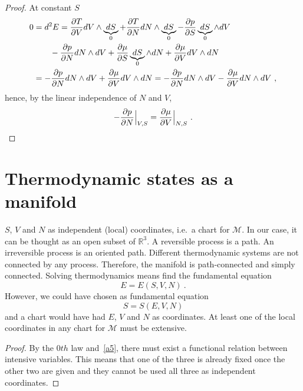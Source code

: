\begin{proof}
        At constant $S$ 
        \begin{equation*}
        \begin{aligned}
            0 & = d^2 E = \frac{\partial T}{\partial V} dV \wedge \underbrace{dS}_0 + \frac{\partial T}{\partial N} dN \wedge \underbrace{dS}_0 - \frac{\partial p}{\partial S} \underbrace{dS}_0 \wedge dV \\ & \qquad - \frac{\partial p}{\partial N} dN \wedge dV + \frac{\partial\mu}{\partial S} \underbrace{dS}_0 \wedge dN + \frac{\partial\mu}{\partial V} dV \wedge dN \\ & = - \frac{\partial p}{\partial N} dN \wedge dV + \frac{\partial\mu}{\partial V} dV \wedge dN = - \frac{\partial p}{\partial N} dN \wedge dV - \frac{\partial\mu}{\partial V} dN \wedge dV ~,
        \end{aligned}
        \end{equation*}
        hence, by the linear independence of $N$ and $V$,
        \begin{equation*}
            - \frac{\partial p}{\partial N} \Big \vert_{V,S} = \frac{\partial\mu}{\partial V} \Big \vert_{N, S} ~.
        \end{equation*}
    \end{proof}

\section{Thermodynamic states as a manifold}

    $S$, $V$ and $N$ as independent (local) coordinates, i.e.~a chart for $\mathcal M$. In our case, it can be thought as an open subset of $\mathbb R^3$. A reversible process is a path. An irreversible process is an oriented path. Different thermodynamic systems are not connected by any process. Therefore, the manifold is path-connected and simply connected. Solving thermodynamics means find the fundamental equation 
    \begin{equation*}
        E = E(S, V, N) ~.
    \end{equation*}
    However, we could have chosen as fundamental equation 
    \begin{equation*}
        S = S(E, V, N) 
    \end{equation*}
    and a chart would have had $E$, $V$ and $N$ as coordinates. At least one of the local coordinates in any chart for $\mathcal M$ must be extensive. 
    \begin{proof}
        By the $0th$ law and~\eqref{a5}, there must exist a functional relation between intensive variables. This means that one of the three is already fixed once the other two are given and they cannot be used all three as independent coordinates.
    \end{proof}

